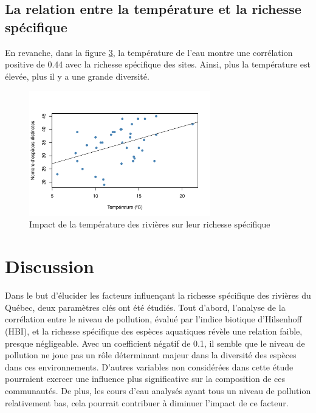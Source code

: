 \documentclass[cm,linguex]{glossa}
\begin{document}
\hypertarget{la-relation-entre-la-tempuxe9rature-et-la-richesse-spuxe9cifique}{%
\subsection{La relation entre la température et la richesse
spécifique}\label{la-relation-entre-la-tempuxe9rature-et-la-richesse-spuxe9cifique}}

En revanche, dans la figure \protect\hyperlink{fig:fig-3}{3}, la
température de l'eau montre une corrélation positive de 0.44 avec la
richesse spécifique des sites. Ainsi, plus la température est élevée,
plus il y a une grande diversité.

\begin{figure}[H]

{\centering \includegraphics[width=0.7\textwidth]{rapport-finale_files/figure-latex/fig-3-1} 

}

\caption{Impact de la température des rivières sur leur richesse spécifique}\label{fig:fig-3}
\end{figure}

\hypertarget{discussion}{%
\section{Discussion}\label{discussion}}

Dans le but d'élucider les facteurs influençant la richesse spécifique
des rivières du Québec, deux paramètres clés ont été étudiés. Tout
d'abord, l'analyse de la corrélation entre le niveau de pollution,
évalué par l'indice biotique d'Hilsenhoff (HBI), et la richesse
spécifique des espèces aquatiques révèle une relation faible, presque
négligeable. Avec un coefficient négatif de 0.1, il semble que le niveau
de pollution ne joue pas un rôle déterminant majeur dans la diversité
des espèces dans ces environnements. D'autres variables non considérées
dans cette étude pourraient exercer une influence plus significative sur
la composition de ces communautés. De plus, les cours d'eau analysés
ayant tous un niveau de pollution relativement bas, cela pourrait
contribuer à diminuer l'impact de ce facteur.
\end{document}
